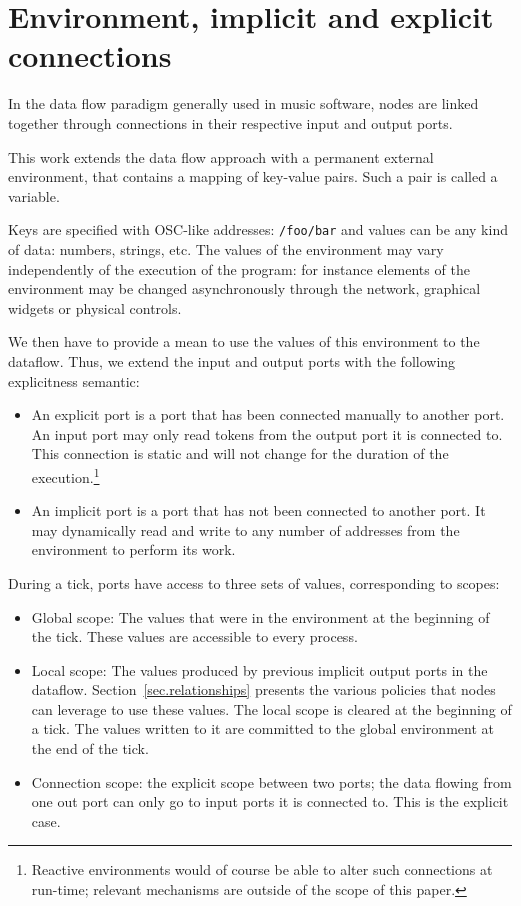 \documentclass{article}
\begin{document}
    
\section{Environment, implicit and explicit connections}
In the data flow paradigm generally used in music software, nodes are linked together through connections in their respective input and output ports.
    
This work extends the data flow approach with a permanent external environment, that contains a mapping of key-value pairs. 
Such a pair is called a variable.

Keys are specified with OSC-like\cite{Freed09featuresand} addresses: \lstinline|/foo/bar| and values can be any kind of data: numbers, strings, etc. 
The values of the environment may vary independently of the execution of the program: for instance elements of the environment may be changed asynchronously through the network, graphical widgets or physical controls.
    
We then have to provide a mean to use the values of this environment to the dataflow.
Thus, we extend the input and output ports with the following explicitness semantic: 
    
\begin{itemize}
  \item{An explicit port is a port that has been connected manually to another port.
        An input port may only read tokens from the output port it is connected to.
        This connection is static and will not change for the duration of the execution.\footnote{Reactive environments would of course be able to alter such connections at run-time; relevant mechanisms are outside of the scope of this paper.}} 
  \item{An implicit port is a port that has not been connected to another port. 
        It may dynamically read and write to any number of addresses from the environment to perform its work.}
\end{itemize}
    
During a tick, ports have access to three sets of values, corresponding to scopes: 
\begin{itemize}
  \item {Global scope: The values that were in the environment at the beginning of the tick. 
  These values are accessible to every process.}
  \item {Local scope: The values produced by previous implicit output ports in the dataflow.
        Section~\ref{sec.relationships} presents the various policies that nodes can leverage to use these values. 
        The local scope is cleared at the beginning of a tick. 
        The values written to it are committed to the global environment at the end of the tick.}
  \item{Connection scope: the explicit scope between two ports; the data flowing from one out port can only go to input ports it is connected to. This is the explicit case.}
\end{itemize}
\end{document}
